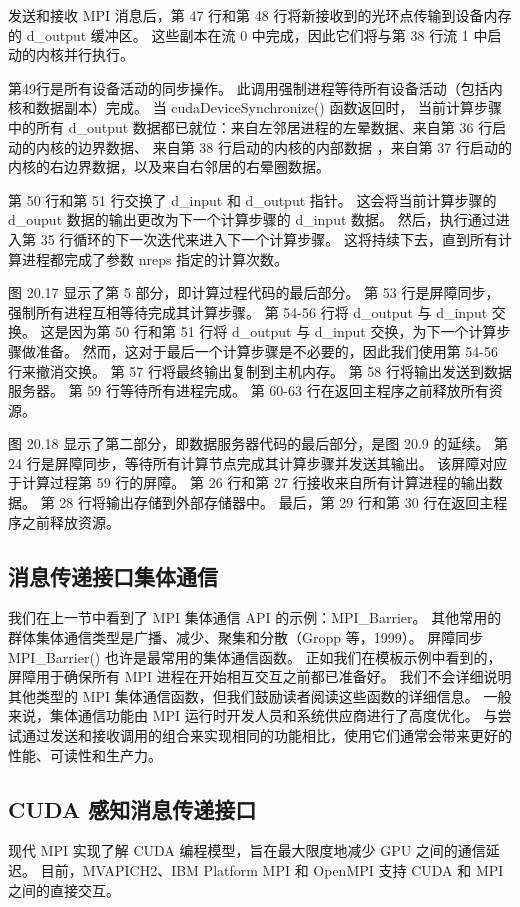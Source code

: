 发送和接收 MPI 消息后，第 47 行和第 48 行将新接收到的光环点传输到设备内存的 d\_output 缓冲区。 
这些副本在流 0 中完成，因此它们将与第 38 行流 1 中启动的内核并行执行。

第49行是所有设备活动的同步操作。 此调用强制进程等待所有设备活动（包括内核和数据副本）完成。 
当 cudaDeviceSynchronize() 函数返回时，
当前计算步骤中的所有 d\_output 数据都已就位：来自左邻居进程的左晕数据、来自第 36 行启动的内核的边界数据、
来自第 38 行启动的内核的内部数据 ，来自第 37 行启动的内核的右边界数据，以及来自右邻居的右晕圈数据。

第 50 行和第 51 行交换了 d\_input 和 d\_output 指针。 
这会将当前计算步骤的 d\_ouput 数据的输出更改为下一个计算步骤的 d\_input 数据。 
然后，执行通过进入第 35 行循环的下一次迭代来进入下一个计算步骤。 
这将持续下去，直到所有计算进程都完成了参数 nreps 指定的计算次数。

图 20.17 显示了第 5 部分，即计算过程代码的最后部分。 第 53 行是屏障同步，强制所有进程互相等待完成其计算步骤。 
第 54-56 行将 d\_output 与 d\_input 交换。 
这是因为第 50 行和第 51 行将 d\_output 与 d\_input 交换，为下一个计算步骤做准备。 
然而，这对于最后一个计算步骤是不必要的，因此我们使用第 54-56 行来撤消交换。 第 57 行将最终输出复制到主机内存。 
第 58 行将输出发送到数据服务器。 第 59 行等待所有进程完成。 第 60-63 行在返回主程序之前释放所有资源。

图 20.18 显示了第二部分，即数据服务器代码的最后部分，是图 20.9 的延续。 
第 24 行是屏障同步，等待所有计算节点完成其计算步骤并发送其输出。 该屏障对应于计算过程第 59 行的屏障。 
第 26 行和第 27 行接收来自所有计算进程的输出数据。 第 28 行将输出存储到外部存储器中。 
最后，第 29 行和第 30 行在返回主程序之前释放资源。

\subsection{消息传递接口集体通信}
我们在上一节中看到了 MPI 集体通信 API 的示例：MPI\_Barrier。 
其他常用的群体集体通信类型是广播、减少、聚集和分散（Gropp 等，1999）。 
屏障同步 MPI\_Barrier() 也许是最常用的集体通信函数。 
正如我们在模板示例中看到的，屏障用于确保所有 MPI 进程在开始相互交互之前都已准备好。 
我们不会详细说明其他类型的 MPI 集体通信函数，但我们鼓励读者阅读这些函数的详细信息。 
一般来说，集体通信功能由 MPI 运行时开发人员和系统供应商进行了高度优化。 
与尝试通过发送和接收调用的组合来实现相同的功能相比，使用它们通常会带来更好的性能、可读性和生产力。

\subsection{CUDA 感知消息传递接口}
现代 MPI 实现了解 CUDA 编程模型，旨在最大限度地减少 GPU 之间的通信延迟。 
目前，MVAPICH2、IBM Platform MPI 和 OpenMPI 支持 CUDA 和 MPI 之间的直接交互。

